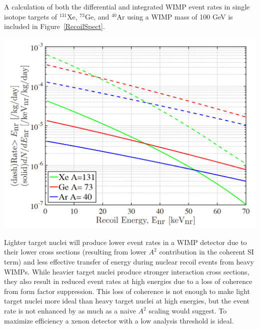 A calculation of both the differential and integrated WIMP event rates in single isotope targets of  $^{131}$Xe, $^{73}$Ge, and $^{40}$Ar using a WIMP mass of 100 GeV is included in Figure~\ref{RecoilSpect}.

\begin{center}
\includegraphics[scale=0.5]{Recoil-spectrum.png}
\label{RecoilSpect}
\end{center}

Lighter target nuclei will produce lower event rates in a WIMP detector due to their lower cross sections (resulting from lower $A^2$ contribution in the coherent SI term) and less effective transfer of energy during nuclear recoil events from heavy WIMPs. While heavier target nuclei produce stronger interaction cross sections, they also result in reduced event rates at high energies due to a loss of coherence from form factor suppression. This loss of coherence is not enough to make light target nuclei more ideal than heavy target nuclei at high energies, but the event rate is not enhanced by as much as a naive $A^2$ scaling would suggest.  To maximize efficiency a xenon detector with a low analysis threshold is ideal.


